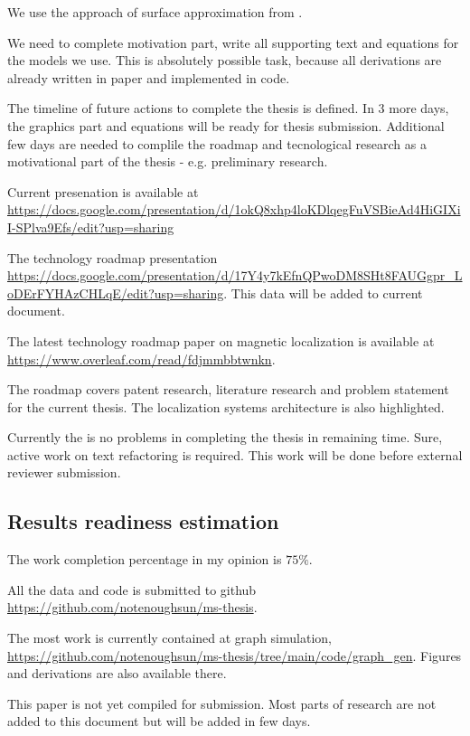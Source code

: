 \documentclass[a4paper, 12pt]{article}
\begin{document}
%	 
%	
%	
%	

We use the approach of surface approximation from \cite{Surface_approximation_GP}.


We need to complete motivation part, write all supporting text and equations for the models we use. 
This is absolutely possible task, because all derivations are already written in paper and implemented in code. 

The timeline of future actions to complete the thesis is defined.
In 3 more days, the graphics part and equations will be ready for thesis submission. Additional few days are needed to complile the roadmap and tecnological research as a motivational part of the thesis - e.g. preliminary research. 

Current presenation is available at \url{https://docs.google.com/presentation/d/1okQ8xhp4loKDlqegFuVSBieAd4HiGIXiI-SPlva9Efs/edit?usp=sharing}


The technology roadmap presentation \url{https://docs.google.com/presentation/d/17Y4y7kEfnQPwoDM8SHt8FAUGgpr_LoDErFYHAzCHLqE/edit?usp=sharing}. This data will be added to current document.

The latest technology roadmap paper on magnetic localization is available at \url{https://www.overleaf.com/read/fdjmmbbtwnkn}.  

The roadmap covers patent research, literature research and problem statement for the current thesis. The localization systems architecture is also highlighted.


Currently the is no problems in completing the thesis in remaining time. Sure, active work on text refactoring is required. This work will be done before external reviewer submission.

\subsection{Results readiness estimation}
The work completion percentage in my opinion is $75\%$.

All the data and code is submitted to github \url{https://github.com/notenoughsun/ms-thesis}.

The most work is currently contained at graph simulation, \url{https://github.com/notenoughsun/ms-thesis/tree/main/code/graph_gen}. Figures and derivations are also available there.

This paper is not yet compiled for submission. Most parts of research are not added to this document but will be added in few days.




\end{document}
